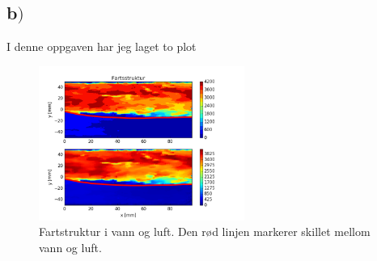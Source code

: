 \documentclass{article}
\begin{document}
\subsection*{b$)$}
I denne oppgaven har jeg laget to plot
\begin{figure}[H]
\centering
\includegraphics[width=0.6\textwidth]{problem_b}
\caption{Fartstruktur i vann og luft. Den rød linjen markerer skillet mellom vann og luft.}
\label{fig:problem_b_contour_fig}
\end{figure}
\end{document}
